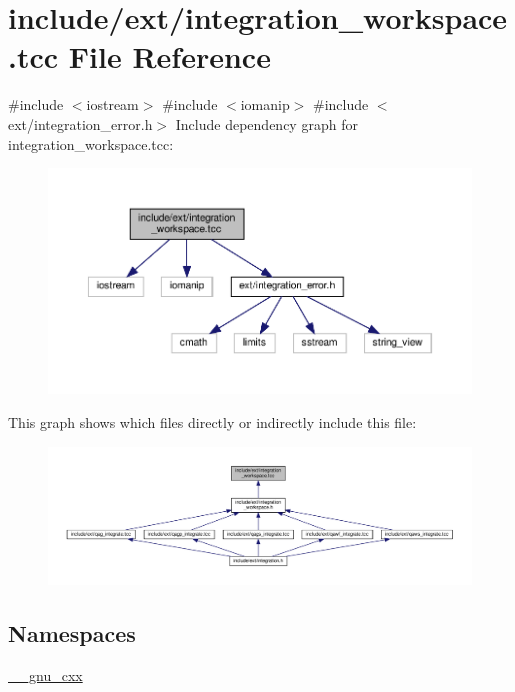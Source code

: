 \hypertarget{integration__workspace_8tcc}{}\section{include/ext/integration\+\_\+workspace.tcc File Reference}
\label{integration__workspace_8tcc}
{\ttfamily \#include $<$iostream$>$}\newline
{\ttfamily \#include $<$iomanip$>$}\newline
{\ttfamily \#include $<$ext/integration\+\_\+error.\+h$>$}\newline
Include dependency graph for integration\+\_\+workspace.\+tcc\+:
\nopagebreak
\begin{figure}[H]
\begin{center}
\leavevmode
\includegraphics[width=350pt]{integration__workspace_8tcc__incl}
\end{center}
\end{figure}
This graph shows which files directly or indirectly include this file\+:
\nopagebreak
\begin{figure}[H]
\begin{center}
\leavevmode
\includegraphics[width=350pt]{integration__workspace_8tcc__dep__incl}
\end{center}
\end{figure}
\subsection*{Namespaces}
\begin{DoxyCompactItemize}
\item 
 \hyperlink{namespace____gnu__cxx}{\+\_\+\+\_\+gnu\+\_\+cxx}
\end{DoxyCompactItemize}
